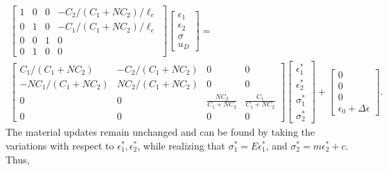 \documentclass[10pt]{cas-sc}
\begin{document}
\begin{multline}
	\begin{bmatrix}
		1 & 0& 0&  -C_2/(C_1+NC_2)/ \ell_e \\
		0 & 1 & 0 & -C_1/(C_1+NC_2)/ \ell_e \\
		0 & 0 & 1 & 0 \\
		0 & 1 & 0 & 0
	\end{bmatrix}
	\begin{bmatrix}
		\epsilon_1 \\
		\epsilon_2 \\
		\sigma \\
		u_D
	\end{bmatrix}
	= \\
	\begin{bmatrix}
		C_1/(C_1+NC_2) & -C_2/(C_1+NC_2) & 0 & 0 \\
		-NC_1/(C_1+NC_2) & NC_2/(C_1+NC_2) & 0 & 0 \\
		0 & 0 & \frac{NC_2}{C_1+N C_2} & \frac{C_1}{C_1+N C_2} \\ 
		0 & 0 & 0&0
	\end{bmatrix}
	\begin{bmatrix}
		\epsilon_1^* \\
		\epsilon_2^* \\
		\sigma_1^* \\
		\sigma_2^* 
	\end{bmatrix}
	+
	\begin{bmatrix}
		0 \\
		0  \\
		0	\\
		\epsilon_0 + \Delta \epsilon
	\end{bmatrix}
	.\label{big_update_mech_al}
\end{multline}
The material updates remain unchanged and can be found by taking the variations with respect to $\epsilon_1^*, \epsilon_2^*$, while realizing that $\sigma_1^*=E\epsilon_1^*$, and $\sigma_2^*=m\epsilon_2^*+c$. Thus,
\end{document}
